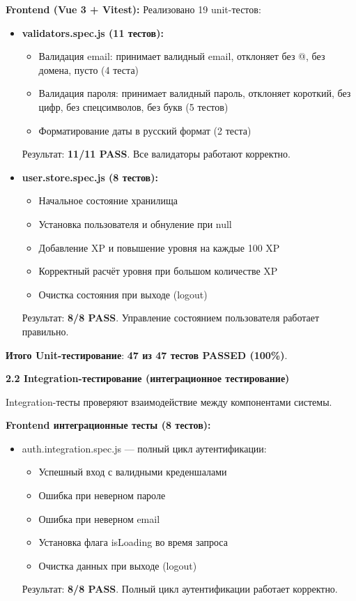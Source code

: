 \textbf{Frontend (Vue 3 + Vitest):} Реализовано 19 unit-тестов:
\begin{itemize}
	\item \textbf{validators.spec.js (11 тестов):}
	\begin{itemize}
		\item Валидация email: принимает валидный email, отклоняет без @, без домена, пусто (4 теста)
		\item Валидация пароля: принимает валидный пароль, отклоняет короткий, без цифр, без спецсимволов, без букв (5 тестов)
		\item Форматирование даты в русский формат (2 теста)
	\end{itemize}
	Результат: \textbf{11/11 PASS}. Все валидаторы работают корректно.
	
	\item \textbf{user.store.spec.js (8 тестов):}
	\begin{itemize}
		\item Начальное состояние хранилища
		\item Установка пользователя и обнуление при null
		\item Добавление XP и повышение уровня на каждые 100 XP
		\item Корректный расчёт уровня при большом количестве XP
		\item Очистка состояния при выходе (logout)
	\end{itemize}
	Результат: \textbf{8/8 PASS}. Управление состоянием пользователя работает правильно.
\end{itemize}

\textbf{Итого Unit-тестирование}: \textbf{47 из 47 тестов PASSED (100\%)}.

\textbf{2.2 Integration-тестирование (интеграционное тестирование)}

Integration-тесты проверяют взаимодействие между компонентами системы.

\textbf{Frontend интеграционные тесты (8 тестов):}
\begin{itemize}
	\item auth.integration.spec.js --- полный цикл аутентификации:
	\begin{itemize}
		\item Успешный вход с валидными креденшалами
		\item Ошибка при неверном пароле
		\item Ошибка при неверном email
		\item Установка флага isLoading во время запроса
		\item Очистка данных при выходе (logout)
	\end{itemize}
	Результат: \textbf{8/8 PASS}. Полный цикл аутентификации работает корректно.
\end{itemize}


